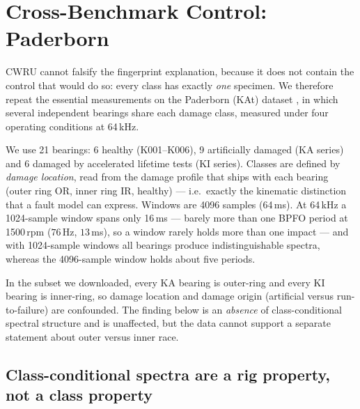\documentclass[journal]{IEEEtran}
\begin{document}
\section{Cross-Benchmark Control: Paderborn}
\label{sec:paderborn}

CWRU cannot falsify the fingerprint explanation, because it does not contain the
control that would do so: every class has exactly \emph{one} specimen. We
therefore repeat the essential measurements on the Paderborn (KAt) dataset
\cite{lessmeier2016paderborn}, in which several independent bearings share each
damage class, measured under four operating conditions at 64\,kHz.

We use 21 bearings: 6 healthy (K001--K006), 9 artificially damaged (KA series)
and 6 damaged by accelerated lifetime tests (KI series). Classes are defined by
\emph{damage location}, read from the damage profile that ships with each
bearing (outer ring OR, inner ring IR, healthy) --- i.e.\ exactly the kinematic
distinction that a fault model can express. Windows are 4096 samples (64\,ms).
At 64\,kHz a 1024-sample window spans only 16\,ms --- barely more than one BPFO
period at 1500\,rpm ($76$\,Hz, $13$\,ms), so a window rarely holds more than one
impact --- and with 1024-sample windows all bearings produce indistinguishable
spectra, whereas the 4096-sample window holds about five periods.

In the subset we downloaded, every KA bearing is outer-ring and every KI
bearing is inner-ring, so damage location and damage origin (artificial versus
run-to-failure) are confounded. The finding below is an \emph{absence} of
class-conditional spectral structure and is unaffected, but the data cannot
support a separate statement about outer versus inner race.

\subsection{Class-conditional spectra are a rig property, not a class property}
\end{document}
